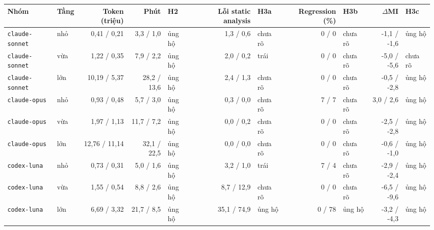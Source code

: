 \begin{tabular}{llrrlrlrlrl}
\toprule
Nhóm & Tầng & Token (triệu) & Phút & H2 & Lỗi static analysis & H3a & Regression (\%) & H3b & $\Delta$MI & H3c \\
\midrule
\texttt{claude-sonnet} & nhỏ & 0,41 / 0,21 & 3,3 / 1,0 & ủng hộ & 1,3 / 0,6 & chưa rõ & 0 / 0 & chưa rõ & -1,1 / -1,6 & ủng hộ \\
\texttt{claude-sonnet} & vừa & 1,22 / 0,35 & 7,9 / 2,2 & ủng hộ & 2,0 / 0,2 & trái & 0 / 0 & chưa rõ & -5,0 / -5,6 & chưa rõ \\
\texttt{claude-sonnet} & lớn & 10,19 / 5,37 & 28,2 / 13,6 & ủng hộ & 2,4 / 1,3 & chưa rõ & 0 / 0 & chưa rõ & -0,5 / -2,8 & ủng hộ \\
\texttt{claude-opus} & nhỏ & 0,93 / 0,48 & 5,7 / 3,0 & ủng hộ & 0,3 / 0,0 & chưa rõ & 7 / 7 & chưa rõ & 3,0 / 2,6 & ủng hộ \\
\texttt{claude-opus} & vừa & 1,97 / 1,13 & 11,7 / 7,2 & ủng hộ & 0,0 / 0,2 & chưa rõ & 0 / 0 & chưa rõ & -2,5 / -2,8 & ủng hộ \\
\texttt{claude-opus} & lớn & 12,76 / 11,14 & 32,1 / 22,5 & ủng hộ & 0,0 / 0,0 & chưa rõ & 0 / 0 & chưa rõ & -0,6 / -1,0 & ủng hộ \\
\texttt{codex-luna} & nhỏ & 0,73 / 0,31 & 5,0 / 1,6 & ủng hộ & 3,2 / 1,0 & trái & 7 / 4 & chưa rõ & -2,9 / -2,4 & ủng hộ \\
\texttt{codex-luna} & vừa & 1,55 / 0,54 & 8,8 / 2,6 & ủng hộ & 8,7 / 12,9 & chưa rõ & 0 / 0 & chưa rõ & -6,5 / -9,6 & ủng hộ \\
\texttt{codex-luna} & lớn & 6,69 / 3,32 & 21,7 / 8,5 & ủng hộ & 35,1 / 74,9 & ủng hộ & 0 / 78 & ủng hộ & -3,2 / -4,3 & ủng hộ \\
\bottomrule
\end{tabular}
